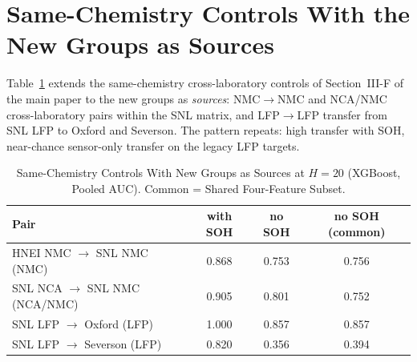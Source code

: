 \documentclass[11pt,a4paper]{article}
\begin{document}
\section{Same-Chemistry Controls With the New Groups as Sources}
Table~\ref{tab:s_samechem_ba} extends the same-chemistry cross-laboratory controls of Section~III-F of the main paper to the new groups as \emph{sources}: NMC$\to$NMC and NCA/NMC cross-laboratory pairs within the SNL matrix, and LFP$\to$LFP transfer from SNL LFP to Oxford and Severson. The pattern repeats: high transfer with SOH, near-chance sensor-only transfer on the legacy LFP targets.
\begin{table}[!htbp]
\caption{Same-Chemistry Controls With New Groups as Sources at $H{=}20$ (XGBoost, Pooled AUC). Common = Shared Four-Feature Subset.}
\label{tab:s_samechem_ba}
\centering\footnotesize\setlength{\tabcolsep}{3pt}
\begin{tabular}{lccc}
\toprule
\textbf{Pair} & \textbf{with SOH} & \textbf{no SOH} & \textbf{no SOH (common)}\\
\midrule
HNEI NMC $\to$ SNL NMC (NMC) & 0.868 & 0.753 & 0.756\\
SNL NCA $\to$ SNL NMC (NCA/NMC) & 0.905 & 0.801 & 0.752\\
SNL LFP $\to$ Oxford (LFP) & 1.000 & 0.857 & 0.857\\
SNL LFP $\to$ Severson (LFP) & 0.820 & 0.356 & 0.394\\
\bottomrule
\end{tabular}
\end{table}
\end{document}

